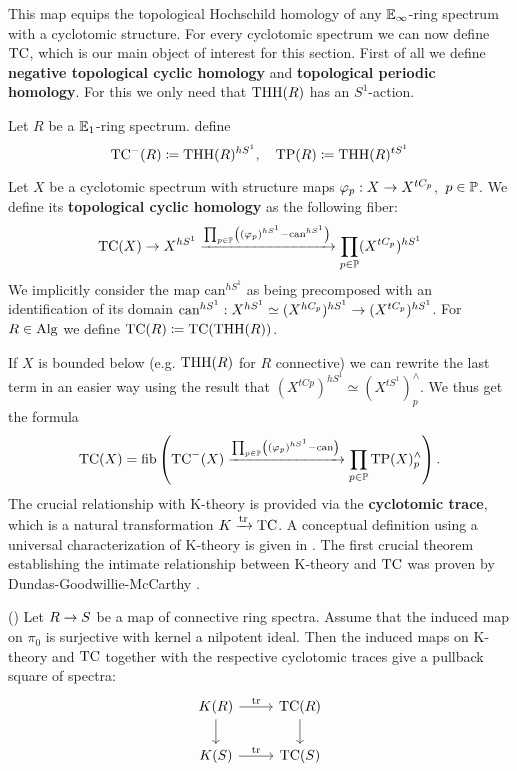 This map equips the topological Hochschild homology of any $\mathbb{E}_\infty$-ring spectrum with a cyclotomic structure. 
For every cyclotomic spectrum we can now define $\operatorname{TC}$, which is our main object of interest for this section.
First of all we define \textbf{negative topological cyclic homology} and \textbf{topological periodic  homology}. For this we only need that $\operatorname{THH}(R)$ has an $S^1$-action.
\begin{defn}
    Let $R$ be a $\mathbb{E}_1$-ring spectrum. define
        \begin{equation*}
          \operatorname{TC}^{-}(R)\coloneqq \operatorname{THH}(R)^{hS^1},\quad   \operatorname{TP}(R)\coloneqq \operatorname{THH}(R)^{tS^1}
        \end{equation*} 
\end{defn}
\begin{defn}
    Let $X$ be a cyclotomic spectrum with structure maps $\varphi_p:X\rightarrow X^{tC_p}$,\ $p\in\mathbb{P}$. We define its \textbf{topological cyclic homology} as the following fiber:
    \begin{equation*}
        \operatorname{TC}(X)\rightarrow X^{hS^1}\xrightarrow{\prod_{p\in\mathbb{P}}\left( (\varphi_p)^{hS^1}-\textrm{can}^{hS^1} \right)}\prod_{p\in\mathbb{P}}(X^{tC_p})^{hS^1} 
    \end{equation*}
    We implicitly consider the map $\textrm{can}^{hS^1}$ as being precomposed with an identification of its domain $\textrm{can}^{hS^1}:X^{hS^1}\simeq (X^{hC_p})^{hS^1}\rightarrow(X^{tC_p})^{hS^1}$.
    For $R\in \operatorname{Alg}$ we define $\operatorname{TC}(R)\coloneqq \operatorname{TC}(\operatorname{THH}(R))$.
\end{defn}
If $X$ is bounded below (e.g. $\operatorname{THH}(R)$ for $R$ connective) we can rewrite the last term in an easier way using the result \cite[Lemma~II.4.2]{NS} that $(X^{tCp})^{hS^1}\simeq (X^{tS^1})_p^{\wedge}$. We thus get the formula
\begin{equation*}
    \operatorname{TC}(X)=\operatorname{fib}\left(  \operatorname{TC}^{-}(X)\xrightarrow{\prod_{p\in\mathbb{P}}\left( (\varphi_p)^{hS^1}-\textrm{can} \right)}\prod_{p\in\mathbb{P}} \operatorname{TP}(X)^{\wedge}_p\right).
\end{equation*}
The crucial relationship with K-theory is provided via the \textbf{cyclotomic trace}, which is a natural transformation $K\xrightarrow{\operatorname{tr}} \operatorname{TC}$. A conceptual definition using a universal characterization of K-theory is given in \cite[Section~10.3]{BGTuniversal}.
The first crucial theorem establishing the intimate relationship between K-theory and $\operatorname{TC}$ was proven by Dundas-Goodwillie-McCarthy .
\begin{thm}(\cite[Theorem~7.2.2.1]{DundasGoodwillieMccarthyLocalstructure})
    Let $R\rightarrow S$ be a map of connective ring spectra. Assume that the induced map on $\pi_0$ is surjective with kernel a nilpotent ideal. Then the induced maps on K-theory and $\operatorname{TC}$ together with the respective cyclotomic traces give a pullback square of spectra:
    \[\begin{tikzcd}
        {K(R)} & {\mathrm{TC}(R)} \\
        {K(S)} & {\mathrm{TC}(S)}
        \arrow["\tr", from=1-1, to=1-2]
        \arrow[from=1-2, to=2-2]
        \arrow[from=1-1, to=2-1]
        \arrow["\tr", from=2-1, to=2-2]
    \end{tikzcd}\]
\end{thm}
